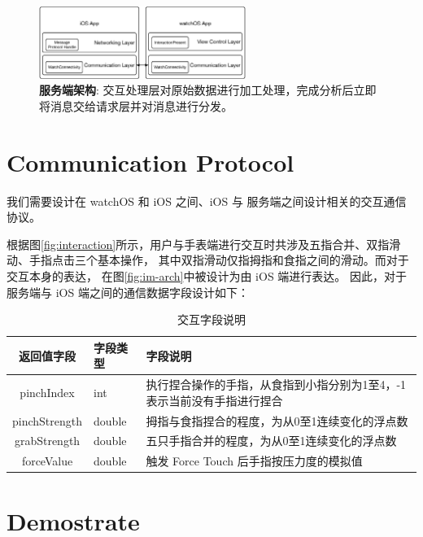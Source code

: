 \begin{figure}[H]
    \kaishu
    \centering
    \includegraphics[width=0.6\textwidth]{figures/client-arch}
    \caption{\kaishu \textbf{服务端架构}: 交互处理层对原始数据进行加工处理，完成分析后立即将消息交给请求层并对消息进行分发。}
    \label{fig:server-arch}
\end{figure}

\section{Communication Protocol}

我们需要设计在 watchOS 和 iOS 之间、iOS 与 服务端之间设计相关的交互通信协议。

根据图\ref{fig:interaction}所示，用户与手表端进行交互时共涉及五指合并、双指滑动、手指点击三个基本操作，
其中双指滑动仅指拇指和食指之间的滑动。而对于交互本身的表达，
在图\ref{fig:im-arch}中被设计为由 iOS 端进行表达。
因此，对于服务端与 iOS 端之间的通信数据字段设计如下：

\begin{table}[H]
    \small
    \kaishu
    \centering
    \begin{tabular}{c l l}
        \toprule
        \textbf{返回值字段}        & \textbf{字段类型} & \textbf{字段说明} \\
        \hline
        pinchIndex     & int    & 执行捏合操作的手指，从食指到小指分别为1至4，-1表示当前没有手指进行捏合 \\
        pinchStrength  & double & 拇指与食指捏合的程度，为从0至1连续变化的浮点数 \\
        grabStrength   & double & 五只手指合并的程度，为从0至1连续变化的浮点数 \\
        forceValue     & double & 触发 Force Touch 后手指按压力度的模拟值\\
        \bottomrule
    \end{tabular}
    \caption{交互字段说明}
    \label{table:server-feild}
\end{table}

\section{Demostrate}

